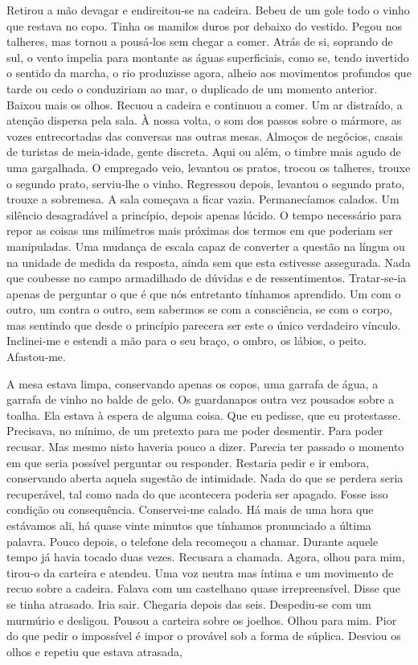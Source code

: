 Retirou a mão devagar e endireitou­‑se na cadeira. Bebeu de um gole todo
o vinho que restava no copo. Tinha os mamilos duros por debaixo do
vestido. Pegou nos talheres, mas tornou a pousá­‑los sem chegar a comer.
Atrás de si, soprando de sul, o vento impelia para montante as águas
superficiais, como se, tendo invertido o sentido da marcha, o rio
produzisse agora, alheio aos movimentos profundos que tarde ou cedo o
conduziriam ao mar, o duplicado de um momento anterior. Baixou mais os
olhos. Recuou a cadeira e continuou a comer. Um ar distraído, a atenção
dispersa pela sala. À nossa volta, o som dos passos sobre o mármore, as
vozes entrecortadas das conversas nas outras mesas. Almoços de negócios,
casais de turistas de meia­‑idade, gente discreta. Aqui ou além, o
timbre mais agudo de uma gargalhada. O empregado veio, levantou os
pratos, trocou os talheres, trouxe o segundo prato, serviu­‑lhe o vinho.
Regressou depois, levantou o segundo prato, trouxe a sobremesa. A sala
começava a ficar vazia. Permanecíamos calados. Um silêncio desagradável
a princípio, depois apenas lúcido. O tempo necessário para repor as
coisas uns milímetros mais próximas dos termos em que poderiam ser
manipuladas. Uma mudança de escala capaz de converter a questão na
língua ou na unidade de medida da resposta, ainda sem que esta estivesse
assegurada. Nada que coubesse no campo armadilhado de dúvidas e de
ressentimentos. Tratar­‑se­‑ia apenas de perguntar o que é que nós
entretanto tínhamos aprendido. Um com o outro, um contra o outro, sem
sabermos se com a consciência, se com o corpo, mas sentindo que desde o
princípio parecera ser este o único verdadeiro vínculo. Inclinei­‑me e
estendi a mão para o seu braço, o ombro, os lábios, o peito.
Afastou­‑me.

A mesa estava limpa, conservando apenas os copos, uma garrafa de água, a
garrafa de vinho no balde de gelo. Os guardanapos outra vez pousados
sobre a toalha. Ela estava à espera de alguma coisa. Que eu pedisse, que
eu protestasse. Precisava, no mínimo, de um pretexto para me poder
desmentir. Para poder recusar. Mas mesmo nisto haveria pouco a dizer.
Parecia ter passado o momento em que seria possível perguntar ou
responder. Restaria pedir e ir embora, conservando aberta aquela
sugestão de intimidade. Nada do que se perdera seria recuperável, tal
como nada do que acontecera poderia ser apagado. Fosse isso condição ou
consequência. Conservei­‑me calado. Há mais de uma hora que estávamos
ali, há quase vinte minutos que tínhamos pronunciado a última palavra.
Pouco depois, o telefone dela recomeçou a chamar. Durante aquele tempo
já havia tocado duas vezes. Recusara a chamada. Agora, olhou para mim,
tirou­‑o da carteira e atendeu. Uma voz neutra mas íntima e um movimento
de recuo sobre a cadeira. Falava com um castelhano quase irrepreensível.
Disse que se tinha atrasado. Iria sair. Chegaria depois das seis.
Despediu­‑se com um murmúrio e desligou. Pousou a carteira sobre os
joelhos. Olhou para mim. Pior do que pedir o impossível é impor o
provável sob a forma de súplica. Desviou os olhos e repetiu que estava
atrasada,

